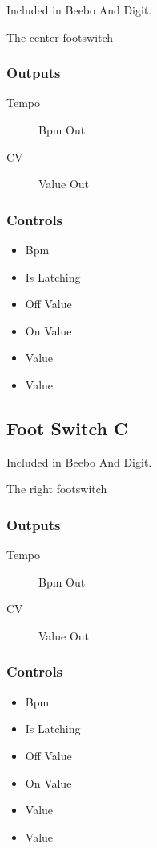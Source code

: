 Included in Beebo And Digit.

The center footswitch



\subsubsection{Outputs}
\begin{description}
\item [Tempo] Bpm Out
\item [CV] Value Out
\end{description}

\subsubsection{Controls}
\begin{itemize}
\item Bpm
\item Is Latching
\item Off Value
\item On Value
\item Value
\item Value
\end{itemize}

\subsection{Foot Switch C}

Included in Beebo And Digit.

The right footswitch



\subsubsection{Outputs}
\begin{description}
\item [Tempo] Bpm Out
\item [CV] Value Out
\end{description}

\subsubsection{Controls}
\begin{itemize}
\item Bpm
\item Is Latching
\item Off Value
\item On Value
\item Value
\item Value
\end{itemize}

